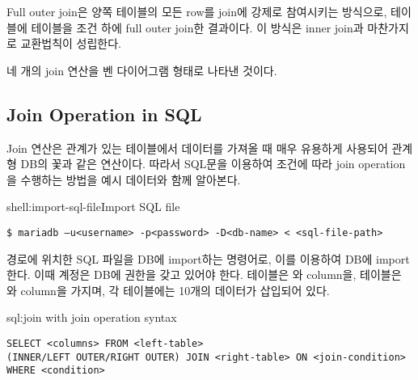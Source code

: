 Full outer join은 양쪽 테이블의 모든 row를 join에 강제로 참여시키는 방식으로, \은  테이블에  테이블을  조건 하에 full outer join한 결과이다. 이 방식은 inner join과 마찬가지로 교환법칙이 성립한다.


\은 네 개의 join 연산을 벤 다이어그램 형태로 나타낸 것이다.

\subsection*{Join Operation in SQL}

Join 연산은 관계가 있는 테이블에서 데이터를 가져올 때 매우 유용하게 사용되어 관계형 DB의 꽃과 같은 연산이다. 따라서 SQL문을 이용하여 조건에 따라 join operation을 수행하는 방법을 예시 데이터와 함께 알아본다.

\begin{shell}{shell:import-sql-file}{Import SQL file}
\begin{verbatim}
$ mariadb –u<username> -p<password> -D<db-name> < <sql-file-path>
\end{verbatim}
\end{shell}

\은  경로에 위치한 SQL 파일을  DB에 import하는 명령어로, 이를 이용하여 \을 DB에 import한다. 이때  계정은  DB에 권한을 갖고 있어야 한다.  테이블은 와  column을,  테이블은 와  column을 가지며, 각 테이블에는 10개의 데이터가 삽입되어 있다.

\begin{sql}{sql:join}{ with join operation syntax}
\begin{verbatim}
SELECT <columns> FROM <left-table>
(INNER/LEFT OUTER/RIGHT OUTER) JOIN <right-table> ON <join-condition>
WHERE <condition>
\end{verbatim}
\end{sql}

